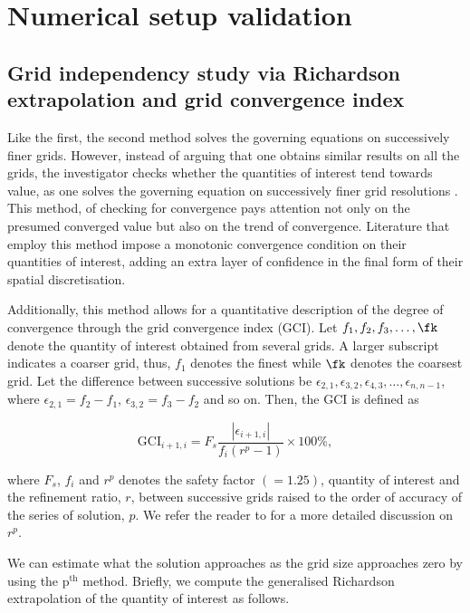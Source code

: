 \documentclass[a4paper,fleqn]{cas-sc}
\begin{document}
\section{Numerical setup validation} \label{sec:numSetup}
\subsection{Grid independency study via Richardson extrapolation and grid convergence index} \label{ssec:richExtrap}
Like the first, the second method solves the governing equations on successively finer grids. However, instead of arguing that one obtains similar results on all the grids, the investigator checks whether the quantities of interest tend towards value, as one solves the governing equation on successively finer grid resolutions \citep{Richardson1927,Stern2001}. This method, of checking for convergence pays attention not only on the presumed converged value but also on the trend of convergence. Literature that employ this method impose a monotonic convergence condition \citep{Stern2001,MatAli2011,Ali2012,Maruai2018} on their quantities of interest, adding an extra layer of confidence in the final form of their spatial discretisation.

Additionally, this method allows for a quantitative description of the degree of convergence through the grid convergence index (GCI). Let $f_{1},f_{2},f_{3},\dots,\fk$ denote the quantity of interest obtained from several grids. A larger subscript indicates a coarser grid, thus, $f_{1}$ denotes the finest while $\fk$ denotes the coarsest grid. Let the difference between successive solutions be $\epsilon_{2,1},\epsilon_{3,2},\epsilon_{4,3},\dots,\epsilon_{n,n-1}$, where $\epsilon_{2,1} = f_{2} - f_{1}$, $\epsilon_{3,2} = f_{3} - f_{2}$ and so on. Then, the GCI is defined as

\begin{equation}
  \text{GCI}_{i+1,i} = F_{s} \frac{\left |\epsilon_{i+1,i} \right |}{f_{i} \left ( r^{p} - 1 \right )} \times 100\%,
  \label{eq:gci}
\end{equation}

\noindent where $F_{s}$, $f_{i}$ and $r^{p}$ denotes the safety factor $\left ( = 1.25 \right )$, quantity of interest and the refinement ratio, $r$, between successive grids raised to the order of accuracy of the series of solution, $p$. We refer the reader to \citet{Stern2001,Langley2018} for a more detailed discussion on $r^{p}$.

We can estimate what the solution approaches as the grid size approaches zero by using the $\text{p}^{\text{th}}$ method. Briefly, we compute the generalised Richardson extrapolation of the quantity of interest as follows.
\end{document}
